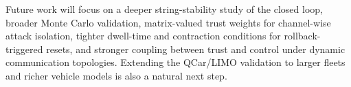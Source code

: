 \documentclass[journal,twoside]{IEEEtran}
\begin{document}
Future work will focus on a deeper string-stability study of the closed loop, broader Monte Carlo validation, matrix-valued trust weights for channel-wise attack isolation, tighter dwell-time and contraction conditions for rollback-triggered resets, and stronger coupling between trust and control under dynamic communication topologies. Extending the QCar/LIMO validation to larger fleets and richer vehicle models is also a natural next step.



\end{document}
